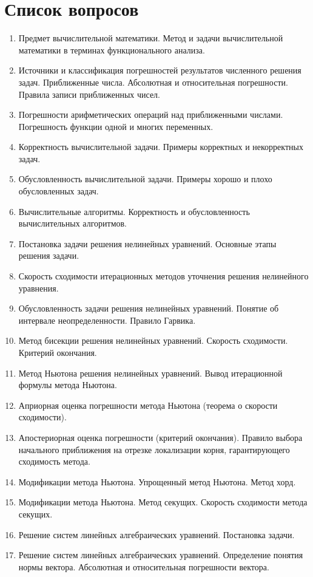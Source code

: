 \documentclass[14pt]{extarticle}
\begin{document}
\section{Список вопросов}
\begin{enumerate}
    \item Предмет вычислительной математики. Метод и задачи вычислительной математики в терминах функционального анализа. 
    \item Источники и классификация погрешностей результатов численного решения задач. Приближенные числа. Абсолютная и относительная погрешности. Правила записи приближенных чисел. 
    \item Погрешности арифметических операций над приближенными числами. Погрешность функции одной и многих переменных. 
    \item Корректность вычислительной задачи. Примеры корректных и некорректных задач. 
    \item Обусловленность вычислительной задачи. Примеры хорошо и плохо обусловленных задач. 
    \item Вычислительные алгоритмы. Корректность и обусловленность вычислительных алгоритмов. 
    \item Постановка задачи решения нелинейных уравнений. Основные этапы решения задачи. 
    \item Скорость сходимости итерационных методов уточнения решения нелинейного уравнения. 
    \item Обусловленность задачи решения нелинейных уравнений. Понятие об интервале неопределенности. Правило Гарвика. 
    \item Метод бисекции решения нелинейных уравнений. Скорость сходимости. Критерий окончания. 
    \item Метод Ньютона решения нелинейных уравнений. Вывод итерационной формулы метода Ньютона. 
    \item Априорная оценка погрешности метода Ньютона (теорема о скорости сходимости). 
    \item Апостериорная оценка погрешности (критерий окончания). Правило выбора начального приближения на отрезке локализации корня, гарантирующего сходимость метода. 
    \item Модификации метода Ньютона. Упрощенный метод Ньютона. Метод хорд. 
    \item Модификации метода Ньютона. Метод секущих. Скорость сходимости метода секущих. 
    \item Решение систем линейных алгебраических уравнений. Постановка задачи. 
    \item Решение систем линейных алгебраических уравнений. Определение понятия нормы вектора. Абсолютная и относительная погрешности вектора. 

\end{enumerate}
\end{document}
